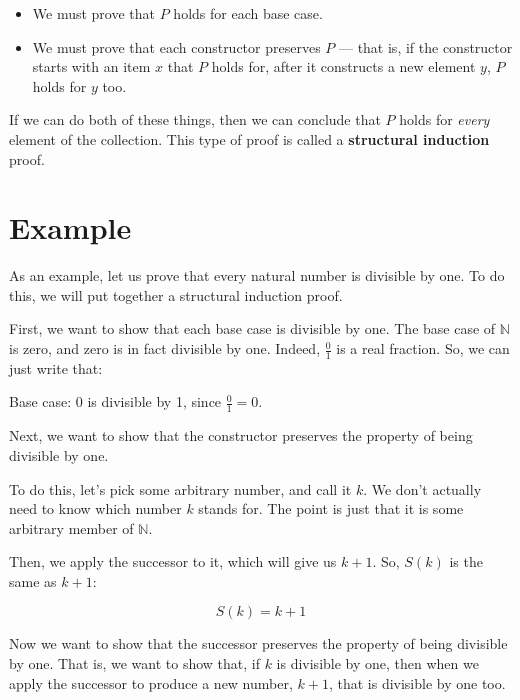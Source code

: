 \documentclass{book}
\numberwithin{equation}{chapter}
\newcommand{\vocab}{\textbf}
\begin{document}
\begin{itemize}
\item{We must prove that $P$ holds for each base case.}
\item{We must prove that each constructor preserves $P$ --- that is, if the constructor starts with an item $x$ that $P$ holds for, after it constructs a new element $y$, $P$ holds for $y$ too.}
\end{itemize}

\noindent
If we can do both of these things, then we can conclude that $P$ holds for \textit{every} element of the collection. This type of proof is called a \vocab{structural induction} proof.


\section{Example}

As an example, let us prove that every natural number is divisible by one. To do this, we will put together a structural induction proof.

First, we want to show that each base case is divisible by one. The base case of $\mathbb{N}$ is zero, and zero is in fact divisible by one. Indeed, $\frac{0}{1}$ is a real fraction. So, we can just write that:

\begin{center}
Base case: 0 is divisible by 1, since $\frac{0}{1} = 0$.
\end{center}

\noindent
Next, we want to show that the constructor preserves the property of being divisible by one.

To do this, let's pick some arbitrary number, and call it $k$. We don't actually need to know which number $k$ stands for. The point is just that it is some arbitrary member of $\mathbb{N}$.

Then, we apply the successor to it, which will give us $k + 1$. So, $S(k)$ is the same as $k + 1$:

\begin{equation}
S(k) = k + 1
\end{equation}

\noindent
Now we want to show that the successor preserves the property of being divisible by one. That is, we want to show that, if $k$ is divisible by one, then when we apply the successor to produce a new number, $k + 1$, that is divisible by one too. 
\end{document}
